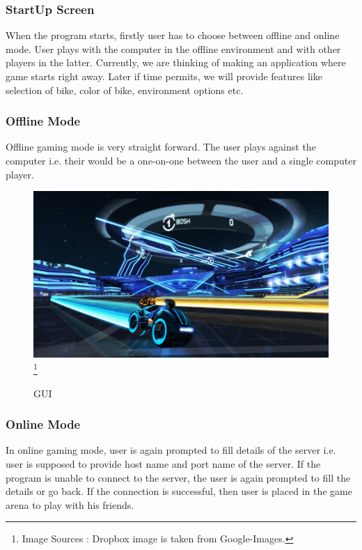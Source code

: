 \documentclass[14 pt]{article}
\begin{document}
\subsubsection{StartUp Screen}
    When the program starts, firstly user has to choose between offline and online mode. User plays with the computer in the offline environment and with other players in the latter. Currently, we are thinking of making an application where game starts right away. Later if time permits, we will provide features like selection of bike, color of bike, environment options etc.\\
    
\subsubsection{Offline Mode}
    Offline gaming mode is very straight forward. The user plays against the computer i.e. their would be a one-on-one between the user and a single computer player.\\

\begin{figure}[h!]
\centering
\includegraphics[width =120 mm]{1.jpg}
\footnote{Image Sources : Dropbox image is taken from Google-Images.}\\
\caption{GUI}
\end{figure}

\subsubsection{Online Mode}
    In online gaming mode, user is again prompted to fill details of the server i.e. user is supposed to provide host name and port name of the server. If the program is unable to connect to the server, the user is again prompted to fill the details or go back. If the connection is successful, then user is placed in the game arena to play with his friends.\\
    
\end{document}

